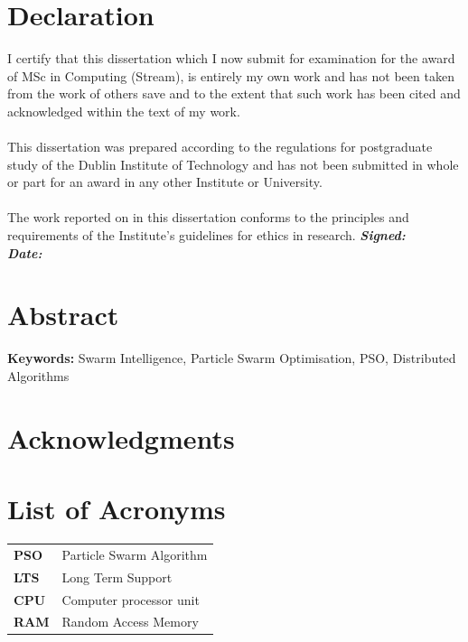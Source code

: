 \documentclass[oneside,12pt]{book}
\begin{document}
\chapter*{Declaration}
I certify that this dissertation which I now submit for examination for the award of
MSc in Computing (Stream), is entirely my own work and has not been taken
from the work of others save and to the extent that such work has been cited and
acknowledged within the text of my work.
\\
\\
This dissertation was prepared according to the regulations for postgraduate study of
the Dublin Institute of Technology and has not been submitted in whole or part for an
award in any other Institute or University.
\\
\\
The work reported on in this dissertation conforms to the principles and requirements
of the Institute’s guidelines for ethics in research.
\vfill
\noindent
\textit{\textbf{Signed:}}  \\

\noindent
\textit{\textbf{Date:}}
\vspace{0.8cm}

\chapter*{Abstract}
\par 

\vfill
\noindent
\textbf{Keywords:} \quad Swarm Intelligence, Particle Swarm Optimisation, PSO, Distributed Algorithms

\chapter*{Acknowledgments}

\newpage
\tableofcontents

\listoffigures

\listoftables

\chapter*{List of Acronyms}
\begin{table}[H]
  \centering
    \begin{tabular}{ l l }
    \textbf{PSO} & Particle Swarm Algorithm \\
    \textbf{LTS} & Long Term Support \\
    \textbf{CPU} & Computer processor unit \\
    \textbf{RAM} & Random Access Memory \\
    \end{tabular}
\end{table}
\end{document}
